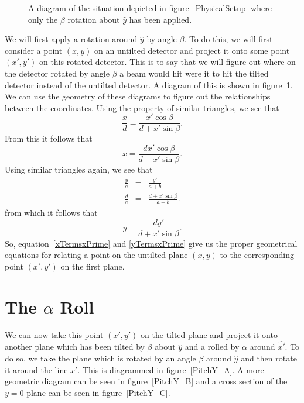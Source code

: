 \begin{figure}[htb]
    \centering
    \subfloat[]{\label{PitchX_A}} 
    \hfill
    \subfloat[]{
    \label{PitchX_B}}
    \caption{A diagram of the situation depicted in 
    figure~\ref{PhysicalSetup} where only the 
    $\beta$ rotation about $\hat y$ has been applied.}
    \label{PitchX}
\end{figure}

We will first apply a rotation around $\hat{y}$ by angle $\beta$.
To do this, we will first consider a point $(x,y)$ on an
untilted detector and project it onto some point $(x',y')$ 
on this rotated detector.
This is to say that we will figure out where on the detector
rotated by angle $\beta$ a
beam would hit were it to hit the tilted detector
instead of the untilted detector.
A diagram of this is shown in figure~\ref{PitchX}.  
We can use the geometry of these diagrams to figure out
the relationships between the coordinates. Using
the property of similar triangles, we see that
\begin{equation}
    \frac{x}{d}=\frac{x'\cos\beta}{d+x'\sin\beta}.
\end{equation}
From this it follows that 
\begin{equation}\label{xTermsxPrime}
    \boxed{x = \frac{dx'\cos\beta}{d+x'\sin\beta}.}
\end{equation}
Using similar triangles again, we see that
\begin{eqnarray}
    \frac{y}{a}&=&\frac{y'}{a+b}\\
    \frac{d}{a}&=&\frac{d+x'\sin\beta}{a+b}.
\end{eqnarray}
from which it follows that
\begin{equation}\label{yTermsxPrime}
	\boxed{y= \frac{dy'}{d+x'\sin\beta}.}
\end{equation}
So, equation~\ref{xTermsxPrime} and \ref{yTermsxPrime} give us 
the proper geometrical equations for relating a point on the 
untilted plane $(x,y)$ to the corresponding point 
$(x',y')$ on the first plane.

\section{\texorpdfstring{The $\alpha$ Roll}{The alpha Roll}}

We can now take this point $(x',y')$ on the tilted 
plane and project it onto another plane which has been
tilted by $\beta$ about $\hat y$ and a rolled by
$\alpha$ around $\hat{x'}$. 
To do so, we take the plane which is
rotated by an angle $\beta$ around $\hat{y}$ and then
rotate it around the line $x'$. 
This is diagrammed in figure~\ref{PitchY_A}. 
A more geometric diagram can be seen in 
figure~\ref{PitchY_B} and a cross section of the $y=0$
plane can be seen in figure~\ref{PitchY_C}.

